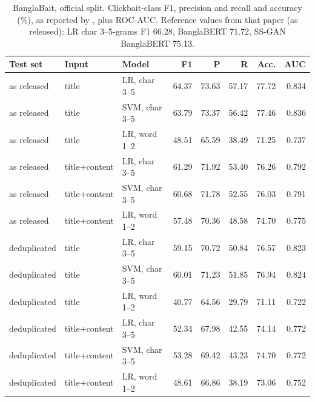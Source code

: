 \begin{table}[t]
\centering
\caption{BanglaBait, official split. Clickbait-class F1, precision and recall and accuracy (\%), as reported by \citet{mahtab2023banglabait}, plus ROC-AUC. Reference values from that paper (as released): LR char 3--5-grams F1 66.28, BanglaBERT 71.72, SS-GAN BanglaBERT 75.13.}\label{tab:bangla}
\small
\begin{tabular}{@{}lllrrrrr@{}}
\toprule
Test set & Input & Model & F1 & P & R & Acc. & AUC \\
\midrule
as released & title & LR, char 3--5 & 64.37 & 73.63 & 57.17 & 77.72 & 0.834 \\
as released & title & SVM, char 3--5 & 63.79 & 73.37 & 56.42 & 77.46 & 0.836 \\
as released & title & LR, word 1--2 & 48.51 & 65.59 & 38.49 & 71.25 & 0.737 \\
as released & title+content & LR, char 3--5 & 61.29 & 71.92 & 53.40 & 76.26 & 0.792 \\
as released & title+content & SVM, char 3--5 & 60.68 & 71.78 & 52.55 & 76.03 & 0.791 \\
as released & title+content & LR, word 1--2 & 57.48 & 70.36 & 48.58 & 74.70 & 0.775 \\
\addlinespace
deduplicated & title & LR, char 3--5 & 59.15 & 70.72 & 50.84 & 76.57 & 0.823 \\
deduplicated & title & SVM, char 3--5 & 60.01 & 71.23 & 51.85 & 76.94 & 0.824 \\
deduplicated & title & LR, word 1--2 & 40.77 & 64.56 & 29.79 & 71.11 & 0.722 \\
deduplicated & title+content & LR, char 3--5 & 52.34 & 67.98 & 42.55 & 74.14 & 0.772 \\
deduplicated & title+content & SVM, char 3--5 & 53.28 & 69.42 & 43.23 & 74.70 & 0.772 \\
deduplicated & title+content & LR, word 1--2 & 48.61 & 66.86 & 38.19 & 73.06 & 0.752 \\
\bottomrule
\end{tabular}
\end{table}
